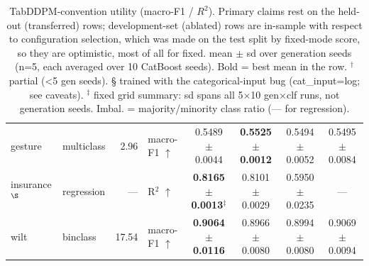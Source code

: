 \begin{table}[t]
\begin{tabular}{llrlcccc}
gesture & multiclass & 2.96 & macro-F1 $\uparrow$ & 0.5489 $\pm$ 0.0044 & \textbf{0.5525 $\pm$ 0.0012} & 0.5494 $\pm$ 0.0052 & 0.5495 $\pm$ 0.0084 \\
insurance$^\S$ & regression & — & R$^2$ $\uparrow$ & \textbf{0.8165 $\pm$ 0.0013}$^\ddagger$ & 0.8101 $\pm$ 0.0029 & 0.5950 $\pm$ 0.0235 & --- \\
wilt & binclass & 17.54 & macro-F1 $\uparrow$ & \textbf{0.9064 $\pm$ 0.0116} & 0.8966 $\pm$ 0.0080 & 0.8994 $\pm$ 0.0080 & 0.9069 $\pm$ 0.0094 \\
\bottomrule
\end{tabular}
\caption{TabDDPM-convention utility (macro-F1 / $R^2$). Primary claims rest on the held-out (transferred) rows; development-set (ablated) rows are in-sample with respect to configuration selection, which was made on the test split by fixed-mode score, so they are optimistic, most of all for fixed. mean $\pm$ sd over generation seeds (n=5, each averaged over 10 CatBoost seeds). Bold = best mean in the row. $^\dagger$ partial (<5 gen seeds). § trained with the categorical-input bug (cat_input=log; see caveats). $^\ddagger$ fixed grid summary: sd spans all 5$\times$10 gen$\times$clf runs, not generation seeds. Imbal. = majority/minority class ratio (— for regression).}
\end{table}

